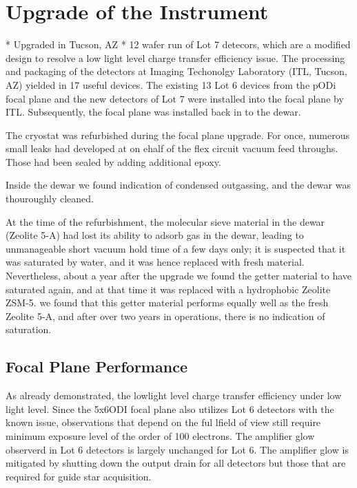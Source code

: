 \documentclass[draft]{spieman}
\begin{document}
\section{Upgrade of the Instrument}
* Upgraded in Tucson, AZ
* 12 wafer run of Lot 7 detecors, which are a modified design to resolve a low light level charge transfer 
efficiency issue\cite{harbeck2014}. The processing and packaging of the detectors at Imaging 
Techonolgy Laboratory  (ITL, Tucson, AZ) \cite{lesser2012} yielded in 17 useful devices. The existing 13 
Lot 6 devices from the pODi focal plane and the new detectors of Lot 7 were installed into the focal 
plane  by ITL. Subsequently, the focal plane was installed back in to the dewar. 

The cryostat was refurbished during the focal plane upgrade. For once, numerous small leaks had 
developed at on ehalf of the flex circuit vacuum feed throughs. Those had been sealed by adding 
additional epoxy. 

Inside the dewar we found indication of condensed outgassing, and the dewar was thouroughly 
cleaned. 

At the time of the refurbishment, the molecular sieve material in the dewar (Zeolite 5-A) had lost its 
ability to adsorb gas in the dewar, leading to unmanageable short vacuum hold time of a few days only; 
it is  suspected 
that it was saturated by water, and it was hence replaced with fresh material. Nevertheless, about a 
year after the upgrade we found the getter material to have saturated again, and at that time it was 
replaced with a hydrophobic Zeolite ZSM-5. we found that this getter material performs equally well as 
the fresh Zeolite 5-A, and after over two years in operations, there is no indication of saturation. 


\subsection{Focal Plane  Performance}

As already demonstrated, the lowlight level charge transfer efficiency under low light level. Since the 
5x6ODI focal plane also utilizes  Lot 6 detectors with the known issue, observations that depend on 
the ful lfield of view still require minimum exposure level of the order of 100 electrons.
 The amplifier glow observerd in Lot 6 detectors is largely unchanged for Lot 6. The amplifier glow is 
 mitigated by shutting down the output drain for all detectors but those that are required for guide star 
 acquisition. 
\end{document}
